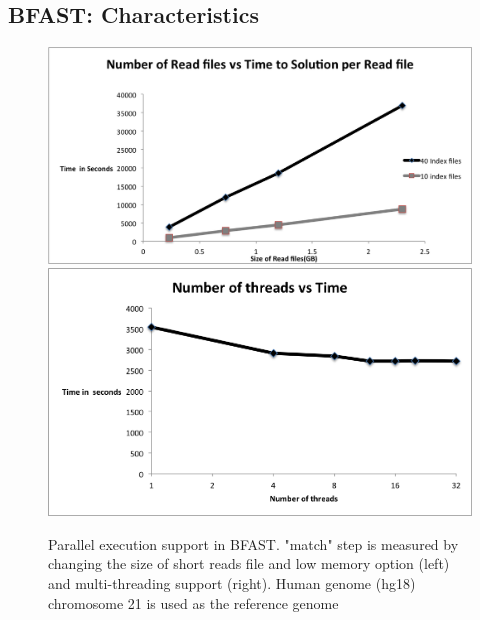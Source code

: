 \documentclass[12pt]{article}
\begin{document}


\subsection{BFAST: Characteristics}

\begin{figure}
 \centering
\includegraphics[scale=0.43]{figures/readvstime.png}
\includegraphics[scale=0.44]{figures/threadsvstime.png} 

\caption{\small Parallel execution support in BFAST.  "match" step is measured by changing the size of short reads file and low memory option (left) and multi-threading support (right).  Human genome (hg18) chromosome 21 is used as the reference genome}
  \label{fig:parallel-execution} 
 \end{figure}
\end{document}
